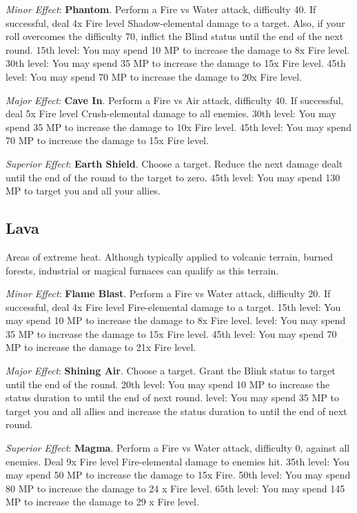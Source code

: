 \begin{multicols}{2}
\textit{Minor Effect}: \textbf{Phantom}. Perform a Fire vs Water attack, difficulty 40. If successful, deal 4x Fire level Shadow-elemental damage to a target. Also, if your roll overcomes the difficulty 70, inflict the Blind status until the end of the next round. 15th level: You may spend 10 MP to increase the damage to 8x Fire level. 30th level: You may spend 35 MP to increase the damage to 15x Fire level. 45th level: You may spend 70 MP to increase the damage to 20x Fire level.

\textit{Major Effect}: \textbf{Cave In}. Perform a Fire vs Air attack, difficulty 40. If successful, deal 5x Fire level Crush-elemental damage to all enemies. 30th level: You may spend 35 MP to increase the damage to 10x Fire level. 45th level: You may spend 70 MP to increase the damage to 15x Fire level.

\textit{Superior Effect}: \textbf{Earth Shield}. Choose a target. Reduce the next damage dealt until the end of the round to the target to zero. 45th level: You may spend 130 MP to target you and all your allies.

\subsection*{Lava}\label{subsec:geo-lava}
Areas of extreme heat. Although typically applied to volcanic terrain, burned forests, industrial or magical furnaces can qualify as this terrain.

\textit{Minor Effect}: \textbf{Flame Blast}. Perform a Fire vs Water attack, difficulty 20. If successful, deal 4x Fire level Fire-elemental damage to a target. 15th level: You may spend 10 MP to increase the damage to 8x Fire level.  level: You may spend 35 MP to increase the damage to 15x Fire level. 45th level: You may spend 70 MP to increase the damage to 21x Fire level.

\textit{Major Effect}: \textbf{Shining Air}. Choose a target. Grant the Blink status to target until the end of the round. 20th level: You may spend 10 MP to increase the status duration to until the end of next round. level: You may spend 35 MP to target you and all allies and increase the status duration to until the end of next round.

\textit{Superior Effect}: \textbf{Magma}. Perform a Fire vs Water attack, difficulty 0, against all enemies. Deal 9x Fire level Fire-elemental damage to enemies hit. 35th level: You may spend 50 MP to increase the damage to 15x Fire. 50th level: You may spend 80 MP to increase the damage to 24 x Fire level. 65th level: You may spend 145 MP to increase the damage to 29 x Fire level.


\end{multicols}
